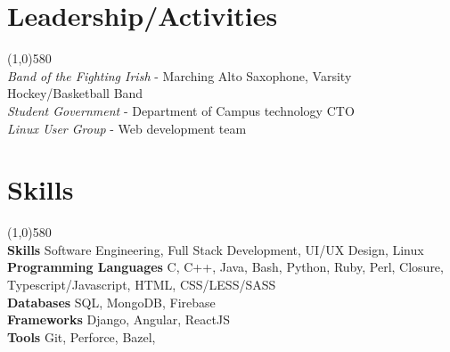 \documentclass[9pt]{article}
\begin{document}
  \vspace{-16pt}
  \section*{Leadership/Activities}
    \vspace{-16pt}
    \line(1,0){580}\\
    \textit{Band of the Fighting Irish}
    -
    Marching Alto Saxophone, Varsity Hockey/Basketball Band
    \\
    \textit{Student Government}
    -
    Department of Campus technology CTO
    \\
    \textit{Linux User Group}
    -
    Web development team
    
  \vspace{-16pt}
  \section*{Skills}
    \vspace{-16pt}
    \line(1,0){580}\\
    \textbf{Skills}
    Software Engineering,
    Full Stack Development,
    UI/UX Design,
    Linux
    \\
    \textbf{Programming Languages}
    C,
    C++,
    Java,
    Bash,
    Python,
    Ruby,
    Perl,
    Closure,
    Typescript/Javascript,
    HTML,
    CSS/LESS/SASS
    \\
    \textbf{Databases}
    SQL,
    MongoDB,
    Firebase
    \\
    \textbf{Frameworks}
    Django,
    Angular,
    ReactJS
    \\
    \textbf{Tools}
    Git,
    Perforce,
    Bazel,
    \\
\end{document}
